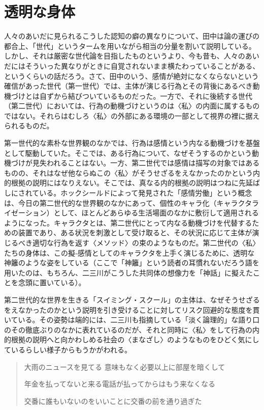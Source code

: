 \documentclass[uplatex,a4paper,oneside,landscape]{jsarticle}
\begin{document}
\section{透明な⾝体}

⼈々のあいだに⾒られるこうした認知の癖の異なりについて、⽥中は論の運びの都合上、「世代」というタームを⽤いながら相当の分量を割いて説明している。しかし、それは厳密な世代論を⽬指したものというより、今も昔も、⼈々のあいだにはそういった異なりがときに⾃覚されないまま横たわっていることがある、というくらいの話だろう。さて、⽥中のいう、感情が絶対になくならないという確信があった世代（第⼀世代）では、主体が演じる⾏為とその背後にあるべき動機づけとは⾃ずから結びついているものだった。⼀⽅で、それに後続する世代（第⼆世代）においては、⾏為の動機づけというのは〈私〉の内⾯に属するものではない。それらはむしろ〈私〉の外部にある環境の⼀部として視界の裡に据えられるものだ。

第⼀世代的な素朴な世界観のなかでは、⾏為は感情という内なる動機づけを基盤として駆動していた。そこでは、ある⾏為について、なぜそうするのかという動機づけが⾒失われることはない。⼀⽅、第⼆世代では感情は描写の対象ではあるものの、それはなぜ他ならぬこの〈私〉がそうせざるをえなかったのかという内的根拠の説明にはなりえない。そこでは、真なる内的根拠の説明はつねに先延ばしにされている。ホックシールドによって発⾒された「感情労働」という概念は、今⽇の第⼆世代的な世界観のなかにあって、個性のキャラ化（キャラクタライゼーション）として、ほとんどあらゆる⽣活場⾯のなかに敷衍して適⽤されるようになった。キャラクタとは、第⼆世代にとって内なる動機づけを代替するための装置であり、ある状況を刺激として受け取ると、その状況に応じて主体が演じるべき適切な⾏為を返す〈メソッド〉の束のようなものだ。第⼆世代の〈私〉たちの⾝体は、この擬‐感情としてのキャラクタを上⼿く演じるために、透明な神籬のような姿をしている（ここで「神籬」という読者の⽿慣れないだろう語を⽤いたのは、もちろん、⼆三川がこうした共同体の想像⼒を「神話」に擬えたことを念頭に置いている）。

第⼆世代的な世界を⽣きる「スイミング・スクール」の主体は、なぜそうせざるをえなかったのかという説明を引き受けることに対してリスク回避的な態度を貫いている。その姿勢は端的には、⼆三川も指摘している「淡く論理的」な語り⼝のその徹底ぶりのなかに表れているのだが、それと同時に〈私〉をして⾏為の内的根拠の説明へと向かわしめる社会の〈まなざし〉のようなものをひどく気にしているらしい様⼦からもうかがわれる。

\begin{quote}
⼤⾬のニュースを⾒てる 意味もなく必要以上に部屋を暗くして

年⾦を払ってないと来る電話が払ってからはもう来なくなる

交番に誰もいないのをいいことに交番の前を通り過ぎた
\end{quote}
\end{document}
